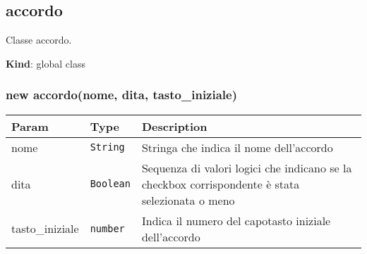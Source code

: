\hypertarget{accordo}{%
\subsection{accordo}\label{accordo}}

Classe accordo.

\textbf{Kind}: global class\\
\protect\hypertarget{new_accordo_new}{}{}

\hypertarget{new-accordonome-dita-tasto_iniziale}{%
\subsubsection{new accordo(nome, dita,
tasto\_iniziale)}\label{new-accordonome-dita-tasto_iniziale}}

\begin{tabularx}{\textwidth}{XXX}
\toprule
\begin{minipage}[b]{0.30\columnwidth}\raggedright
Param\strut
\end{minipage} & \begin{minipage}[b]{0.30\columnwidth}\raggedright
Type\strut
\end{minipage} & \begin{minipage}[b]{0.30\columnwidth}\raggedright
Description\strut
\end{minipage}\tabularnewline
\midrule
\endhead
\begin{minipage}[t]{0.30\columnwidth}\raggedright
nome\strut
\end{minipage} & \begin{minipage}[t]{0.30\columnwidth}\raggedright
\texttt{String}\strut
\end{minipage} & \begin{minipage}[t]{0.30\columnwidth}\raggedright
Stringa che indica il nome dell'accordo\strut
\end{minipage}\tabularnewline
\begin{minipage}[t]{0.30\columnwidth}\raggedright
dita\strut
\end{minipage} & \begin{minipage}[t]{0.30\columnwidth}\raggedright
\texttt{Boolean}\strut
\end{minipage} & \begin{minipage}[t]{0.30\columnwidth}\raggedright
Sequenza di valori logici che indicano se la checkbox corrispondente è
stata selezionata o meno\strut
\end{minipage}\tabularnewline
\begin{minipage}[t]{0.30\columnwidth}\raggedright
tasto\_iniziale\strut
\end{minipage} & \begin{minipage}[t]{0.30\columnwidth}\raggedright
\texttt{number}\strut
\end{minipage} & \begin{minipage}[t]{0.30\columnwidth}\raggedright
Indica il numero del capotasto iniziale dell'accordo\strut
\end{minipage}\tabularnewline
\bottomrule
\end{tabularx}

